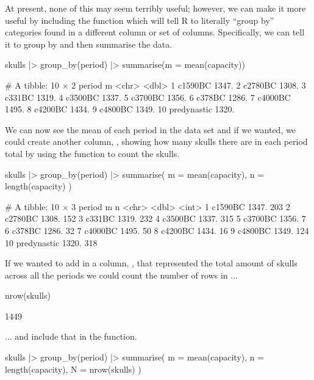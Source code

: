 At present, none of this may seem terribly useful; however, we can make it more useful by including the  function which will tell R to literally ``group by'' categories found in a different column or set of columns. Specifically, we can tell it to group by  and then summarise the data.

\begin{inR}
skulls |> 
  group_by(period) |> 
  summarise(m = mean(capacity))
\end{inR}
\begin{outR}
# A tibble: 10 × 2
   period          m
   <chr>       <dbl>
 1 c1590BC     1347.
 2 c2780BC     1308.
 3 c331BC      1319.
 4 c3500BC     1337.
 5 c3700BC     1356.
 6 c378BC      1286.
 7 c4000BC     1495.
 8 c4200BC     1434.
 9 c4800BC     1349.
10 predynastic 1320.
\end{outR}

We can now see the mean of each period in the data set and if we wanted, we could create another column, , showing how many skulls there are in each period total by using the  function to count the skulls.

\begin{inR}
skulls |>
  group_by(period) |>
  summarise(
    m = mean(capacity),
    n = length(capacity)
  )
\end{inR}
\begin{outR}
# A tibble: 10 × 3
   period          m     n
   <chr>       <dbl> <int>
 1 c1590BC     1347.   203
 2 c2780BC     1308.   152
 3 c331BC      1319.   232
 4 c3500BC     1337.   315
 5 c3700BC     1356.     7
 6 c378BC      1286.    32
 7 c4000BC     1495.    50
 8 c4200BC     1434.    16
 9 c4800BC     1349.   124
10 predynastic 1320.   318
\end{outR}

If we wanted to add in a column, , that represented the total amount of skulls across all the periods we could count the number of rows in ...

\begin{inR}
nrow(skulls)
\end{inR}
\begin{outR}
[1] 1449
\end{outR}

\noindent
... and include that in the  function.

\begin{inR}
skulls |>
  group_by(period) |>
  summarise(
    m = mean(capacity),
    n = length(capacity),
    N = nrow(skulls)
  )
\end{inR}

